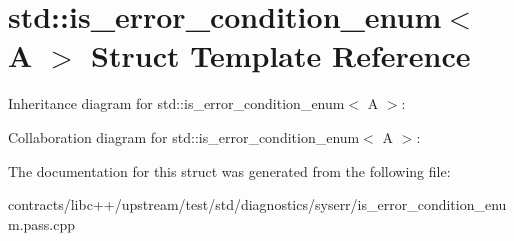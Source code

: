 \hypertarget{structstd_1_1is__error__condition__enum_3_01_a_01_4}{}\section{std\+:\+:is\+\_\+error\+\_\+condition\+\_\+enum$<$ A $>$ Struct Template Reference}
\label{structstd_1_1is__error__condition__enum_3_01_a_01_4}


Inheritance diagram for std\+:\+:is\+\_\+error\+\_\+condition\+\_\+enum$<$ A $>$\+:


Collaboration diagram for std\+:\+:is\+\_\+error\+\_\+condition\+\_\+enum$<$ A $>$\+:


The documentation for this struct was generated from the following file\+:\begin{DoxyCompactItemize}
\item 
contracts/libc++/upstream/test/std/diagnostics/syserr/is\+\_\+error\+\_\+condition\+\_\+enum.\+pass.\+cpp\end{DoxyCompactItemize}
